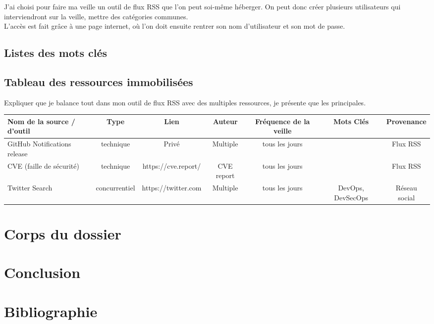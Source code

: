 \documentclass[11pt,a4paper,oneside]{book}
\begin{document}
J'ai choisi pour faire ma veille un outil de flux RSS que l'on peut soi-même héberger.
On peut donc créer plusieurs utilisateurs qui interviendront sur la veille, mettre des catégories communes. \\
L'accès est fait grâce à une page internet, où l'on doit ensuite rentrer son nom d'utilisateur et son mot de passe.

\section{Listes des mots clés}

\newpage

\begin{landscape}

\section{Tableau des ressources immobilisées}

Expliquer que je balance tout dans mon outil de flux RSS avec des multiples ressources, je présente que les principales.

\begin{tabular}{|l|c|c|c|c|c|c|}
\hline
\rowcolor{gray!30} Nom de la source / d'outil & Type & Lien & Auteur & Fréquence de la veille & Mots Clés & Provenance \\
\hline
GitHub Notifications release & technique & Privé & Multiple & tous les jours & & Flux RSS \\
CVE (faille de sécurité) & technique & https://cve.report/ & CVE report & tous les jours & & Flux RSS \\
Twitter Search & concurrentiel & https://twitter.com & Multiple & tous les jours & DevOps, DevSecOps & Réseau social \\
\hline
\end{tabular}

\end{landscape}

\chapter{Corps du dossier}

\chapter{Conclusion}


\chapter{Bibliographie}
\end{document}
